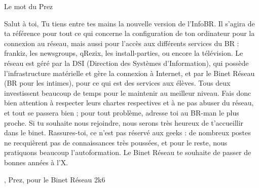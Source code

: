 

\begin{center}
    { \Huge Le mot du Prez }
\end{center}

{   Salut \`a toi,}
\newline
\newline
{   Tu tiens entre tes mains la nouvelle version de l'InfoBR. Il s'agira de ta r\'ef\'erence pour tout ce qui concerne la configuration de ton ordinateur pour la connexion au r\'eseau, mais aussi pour l'acc\`es aux diff\'erents services du BR :
frankiz, les newsgroups, qRezix, les install-parties, ou encore la t\'el\'evision.}
\newline
\newline
Le r\'eseau est g\'er\'e par la DSI (Direction des Syst\`emes d'Information), qui poss\`ede l'infrastructure mat\'erielle et g\`ere la connexion \`a Internet,
et par le Binet R\'eseau (BR pour les intimes), pour ce qui est des services aux \'el\`eves. Tous deux investissent beaucoup de temps pour le maintenir au meilleur niveau.
Fais donc bien attention \`a respecter leurs chartes respectives et \`a ne pas abuser du r\'eseau, et tout se passera bien ; pour tout probl\`eme, adresse toi au
BR-man le plus proche.
\newline
\newline
Si tu souhaite nous rejoindre, nous serons tr\`es heureux de t'accueillir dans le binet. Rassures-toi, ce n'est pas r\'eserv\'e aux geeks : de nombreux postes ne recqui\`erent pas de connaissances tr\`es pouss\'ees, et pour le reste, nous pratiquons beaucoup l'autoformation.
\newline
\newline
Le Binet R\'eseau te souhaite de passer de bonnes ann\'ees \`a l'X.
\newline

\begin{flushright}
    , Prez, pour le Binet R\'eseau 2k6
\end{flushright}
